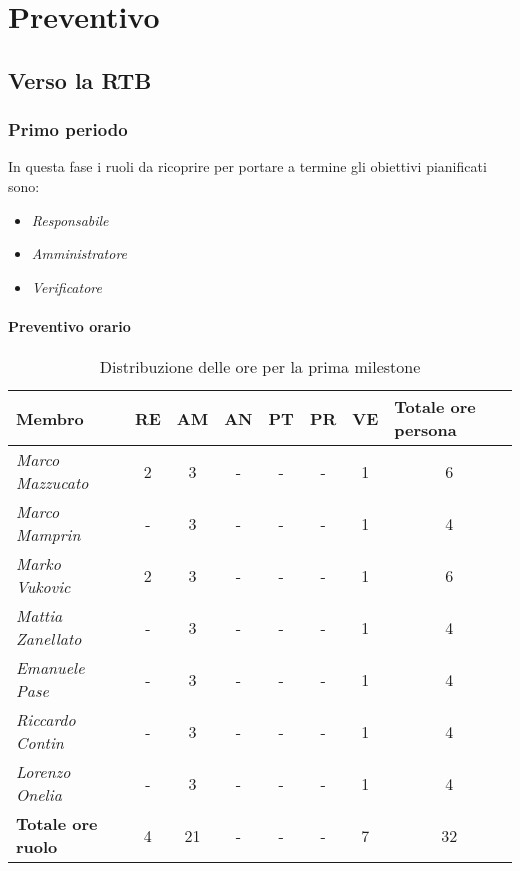 \chapter{Preventivo}

\section{Verso la RTB}

\subsection{Primo periodo}

In questa fase i ruoli da ricoprire per portare a termine gli obiettivi
pianificati sono:
\begin{itemize}
    \item \textit{Responsabile}
    \item \textit{Amministratore}
    \item \textit{Verificatore}
\end{itemize}

\subsubsection{Preventivo orario}

\begin{table}[!ht]
    \centering
    \begin{tabular}{|l|c|c|c|c|c|c|c|}
    \hline
    \textbf{Membro} & \multicolumn{1}{l|}{\textbf{RE}} & \multicolumn{1}{l|}{\textbf{AM}} & \multicolumn{1}{l|}{\textbf{AN}} & \multicolumn{1}{l|}{\textbf{PT}} & \multicolumn{1}{l|}{\textbf{PR}} & \multicolumn{1}{l|}{\textbf{VE}} & \multicolumn{1}{l|}{\textbf{Totale ore persona}} \\ \hline
    \textit{Marco Mazzucato}  & 2 & 3  & - & - & - & 1 & 6  \\ \hline
    \textit{Marco Mamprin}    & - & 3  & - & - & - & 1 & 4  \\ \hline
    \textit{Marko Vukovic}    & 2 & 3  & - & - & - & 1 & 6  \\ \hline
    \textit{Mattia Zanellato} & - & 3  & - & - & - & 1 & 4  \\ \hline
    \textit{Emanuele Pase}    & - & 3  & - & - & - & 1 & 4  \\ \hline
    \textit{Riccardo Contin}  & - & 3  & - & - & - & 1 & 4  \\ \hline
    \textit{Lorenzo Onelia}   & - & 3  & - & - & - & 1 & 4  \\ \hline
    \textbf{Totale ore ruolo} & 4 & 21 & - & - & - & 7 & 32 \\ \hline
    \end{tabular}
    \caption{Distribuzione delle ore per la prima milestone}
\end{table}

